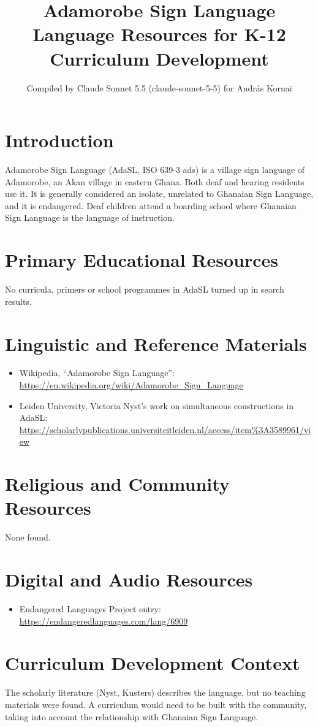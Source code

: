 \documentclass[12pt]{article}
\title{Adamorobe Sign Language Language Resources for K-12 Curriculum Development}
\author{Compiled by Claude Sonnet 5.5 (claude-sonnet-5-5) for Andr\'as Kornai}
\date{}
\begin{document}
\maketitle

\section{Introduction}
Adamorobe Sign Language (AdaSL, ISO 639-3 ads) is a village sign language of Adamorobe, an Akan village in eastern Ghana. Both deaf and hearing residents use it. It is generally considered an isolate, unrelated to Ghanaian Sign Language, and it is endangered. Deaf children attend a boarding school where Ghanaian Sign Language is the language of instruction.

\section{Primary Educational Resources}
No curricula, primers or school programmes in AdaSL turned up in search results.

\section{Linguistic and Reference Materials}
\begin{itemize}
\item Wikipedia, ``Adamorobe Sign Language'': \url{https://en.wikipedia.org/wiki/Adamorobe_Sign_Language}
\item Leiden University, Victoria Nyst's work on simultaneous constructions in AdaSL: \url{https://scholarlypublications.universiteitleiden.nl/access/item%3A3589961/view}
\end{itemize}

\section{Religious and Community Resources}
None found.

\section{Digital and Audio Resources}
\begin{itemize}
\item Endangered Languages Project entry: \url{https://endangeredlanguages.com/lang/6909}
\end{itemize}

\section{Curriculum Development Context}
The scholarly literature (Nyst, Kusters) describes the language, but no teaching materials were found. A curriculum would need to be built with the community, taking into account the relationship with Ghanaian Sign Language.
\end{document}

